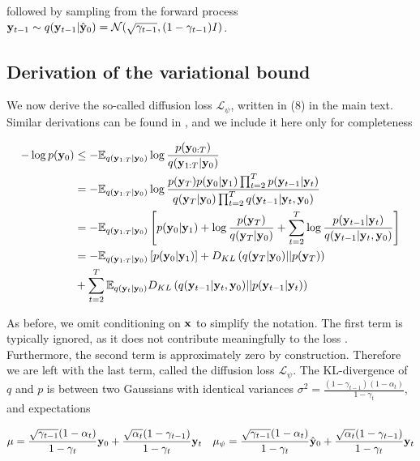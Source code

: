 followed by sampling from the forward process $\bold{y}_{t-1} \sim q(\bold{y}_{t-1}\lvert\hat{\bold{y}}_{0}) = \mathcal{N}(\sqrt{\gamma_{t-1}},(1-\gamma_{t-1})I)$. 


\subsection{Derivation of the variational bound}

We now derive the so-called diffusion loss $\mathcal{L}_{\psi}$, written in (8) in the main text. Similar derivations can be found in \parencite{Kingma2021,Ribeiro2024}, and we include it here only for completeness

\begin{align*}
-\log p(\bold{y}_{0}) &\leq - \mathbb{E}_{q(\bold{y}_{1:T}\lvert\bold{y}_{0})} \log \frac{p(\bold{y}_{0:T})}{q(\bold{y}_{1:T}\lvert\bold{y}_{0})}\\
&= -\mathbb{E}_{q(\bold{y}_{1:T}\lvert\bold{y}_{0})} \log \frac{p(\bold{y}_{T})p(\bold{y}_0\lvert\bold{y}_1) \prod_{t=2}^{T}p(\bold{y}_{t-1}\lvert\bold{y}_t)}{q(\bold{y}_T\lvert\bold{y}_0)\prod_{t=2}^{T}q(\bold{y}_{t-1}\lvert\bold{y}_t,\bold{y}_0)}\\
&= -\mathbb{E}_{q(\bold{y}_{1:T}\lvert\bold{y}_{0})} \left[ p(\bold{y}_0\lvert\bold{y}_1) + \log \frac{p(\bold{y}_{T})}{q(\bold{y}_T\lvert\bold{y}_0)} + \sum_{t=2}^{T} \log \frac{p(\bold{y}_{t-1}\lvert\bold{y}_t)}{q(\bold{y}_{t-1}\lvert\bold{y}_t,\bold{y}_0)}\right]\\
&= -\mathbb{E}_{q(\bold{y}_{1:T}\lvert\bold{y}_{0})} \left[ p(\bold{y}_0\lvert\bold{y}_1)\right] + D_{KL}\left(q(\bold{y}_T\lvert\bold{y}_0) \lvert\lvert p(\bold{y}_{T})\right) \\
&+ \sum_{t=2}^{T} \mathbb{E}_{q(\bold{y}_{t}\lvert\bold{y}_{0})} D_{KL}\left(q(\bold{y}_{t-1}\lvert\bold{y}_t,\bold{y}_0)\lvert\lvert p(\bold{y}_{t-1}\lvert\bold{y}_t) \right)
\end{align*}

As before, we omit conditioning on $\bold{x}$ to simplify the notation. The first term is typically ignored, as it does not contribute meaningfully to the loss \parencite{Ribeiro2024}. Furthermore, the second term is approximately zero by construction. Therefore we are left with the last term, called the diffusion loss $\mathcal{L}_{\psi}$. The KL-divergence of $q$ and $p$ is between two Gaussians with identical variances $\sigma^{2} = \frac{(1-\gamma_{t-1})(1-\alpha_{t})}{1-\gamma_{t}}$, and expectations

\begin{align*}
\mu = \frac{\sqrt{\gamma_{t-1}}(1-\alpha_{t})}{1-\gamma_{t}}\bold{y}_{0}+ \frac{\sqrt{\alpha_{t}}(1-\gamma_{t-1})}{{1-\gamma_{t}}}\bold{y}_{t} \quad \mu_{\psi} = \frac{\sqrt{\gamma_{t-1}}(1-\alpha_{t})}{1-\gamma_{t}}\hat{\bold{y}}_{0}+ \frac{\sqrt{\alpha_{t}}(1-\gamma_{t-1})}{{1-\gamma_{t}}}\bold{y}_{t}
\end{align*}

